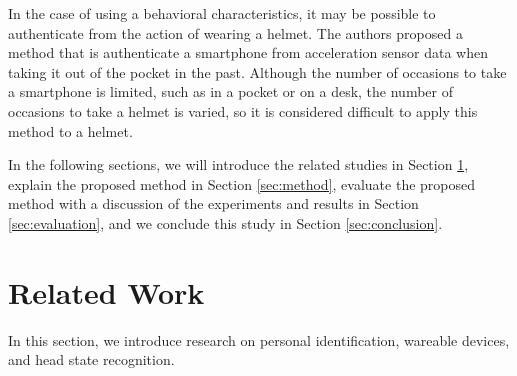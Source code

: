\documentclass[sigchi,authordraft]{acmart}
\begin{document}

In the case of using a behavioral characteristics, it may be possible to authenticate from the action of wearing a helmet. The authors proposed a method that is authenticate a smartphone from acceleration sensor data when taking it out of the pocket in the past\cite{murao_screen_unlock}. Although the number of occasions to take a smartphone is limited, such as in a pocket or on a desk, the number of occasions to take a helmet is varied, so it is considered difficult to apply this method to a helmet.\par


In the following sections, we will introduce the related studies in Section \ref{sec:related}, explain the proposed method in Section \ref{sec:method}, evaluate the proposed method with a discussion of the experiments and results in Section \ref{sec:evaluation}, and we conclude this study in Section \ref{sec:conclusion}.


\section{Related Work}
\label{sec:related}
In this section, we introduce research on personal identification, wareable devices, and head state recognition.
\end{document}
